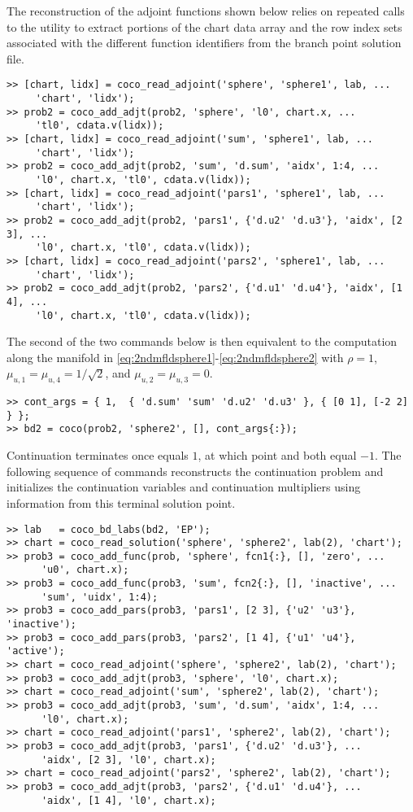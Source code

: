 The reconstruction of the adjoint functions shown below relies on repeated calls to the  utility to extract portions of the chart data array and the row index sets associated with the different function identifiers from the branch point solution file.
\begin{lstlisting}[language=coco-highlight]
>> [chart, lidx] = coco_read_adjoint('sphere', 'sphere1', lab, ...
     'chart', 'lidx');
>> prob2 = coco_add_adjt(prob2, 'sphere', 'l0', chart.x, ...
     'tl0', cdata.v(lidx));
>> [chart, lidx] = coco_read_adjoint('sum', 'sphere1', lab, ...
     'chart', 'lidx');
>> prob2 = coco_add_adjt(prob2, 'sum', 'd.sum', 'aidx', 1:4, ...
     'l0', chart.x, 'tl0', cdata.v(lidx));
>> [chart, lidx] = coco_read_adjoint('pars1', 'sphere1', lab, ...
     'chart', 'lidx');
>> prob2 = coco_add_adjt(prob2, 'pars1', {'d.u2' 'd.u3'}, 'aidx', [2 3], ...
     'l0', chart.x, 'tl0', cdata.v(lidx));
>> [chart, lidx] = coco_read_adjoint('pars2', 'sphere1', lab, ...
     'chart', 'lidx');
>> prob2 = coco_add_adjt(prob2, 'pars2', {'d.u1' 'd.u4'}, 'aidx', [1 4], ...
     'l0', chart.x, 'tl0', cdata.v(lidx));
\end{lstlisting}  
The second of the two commands below is then equivalent to the computation along the manifold in \eqref{eq:2ndmfldsphere1}-\eqref{eq:2ndmfldsphere2} with $\rho=1$, $\mu_{u,1}=\mu_{u,4}=1/\sqrt{2}$, and $\mu_{u,2}=\mu_{u,3}=0$.
\begin{lstlisting}[language=coco-highlight]
>> cont_args = { 1,  { 'd.sum' 'sum' 'd.u2' 'd.u3' }, { [0 1], [-2 2] } };
>> bd2 = coco(prob2, 'sphere2', [], cont_args{:});
\end{lstlisting}
Continuation terminates once  equals $1$, at which point  and  both equal $-1$. The following sequence of commands reconstructs the continuation problem and initializes the continuation variables and continuation multipliers using information from this terminal solution point.
\begin{lstlisting}[language=coco-highlight]
>> lab   = coco_bd_labs(bd2, 'EP');
>> chart = coco_read_solution('sphere', 'sphere2', lab(2), 'chart');
>> prob3 = coco_add_func(prob, 'sphere', fcn1{:}, [], 'zero', ...
      'u0', chart.x);
>> prob3 = coco_add_func(prob3, 'sum', fcn2{:}, [], 'inactive', ...
      'sum', 'uidx', 1:4);
>> prob3 = coco_add_pars(prob3, 'pars1', [2 3], {'u2' 'u3'}, 'inactive');
>> prob3 = coco_add_pars(prob3, 'pars2', [1 4], {'u1' 'u4'}, 'active');
>> chart = coco_read_adjoint('sphere', 'sphere2', lab(2), 'chart');
>> prob3 = coco_add_adjt(prob3, 'sphere', 'l0', chart.x);
>> chart = coco_read_adjoint('sum', 'sphere2', lab(2), 'chart');
>> prob3 = coco_add_adjt(prob3, 'sum', 'd.sum', 'aidx', 1:4, ...
      'l0', chart.x);
>> chart = coco_read_adjoint('pars1', 'sphere2', lab(2), 'chart');
>> prob3 = coco_add_adjt(prob3, 'pars1', {'d.u2' 'd.u3'}, ...
      'aidx', [2 3], 'l0', chart.x);
>> chart = coco_read_adjoint('pars2', 'sphere2', lab(2), 'chart');
>> prob3 = coco_add_adjt(prob3, 'pars2', {'d.u1' 'd.u4'}, ...
      'aidx', [1 4], 'l0', chart.x);
\end{lstlisting}
